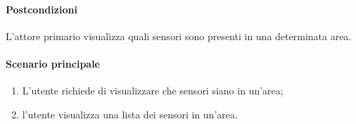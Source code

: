 \paragraph{Postcondizioni} L'attore primario visualizza quali sensori sono presenti in una determinata area.

\paragraph{Scenario principale}
\begin{enumerate}
    \item L'utente richiede di visualizzare che sensori siano in un'area;
    \item l'utente visualizza una lista dei sensori in un'area.
\end{enumerate}